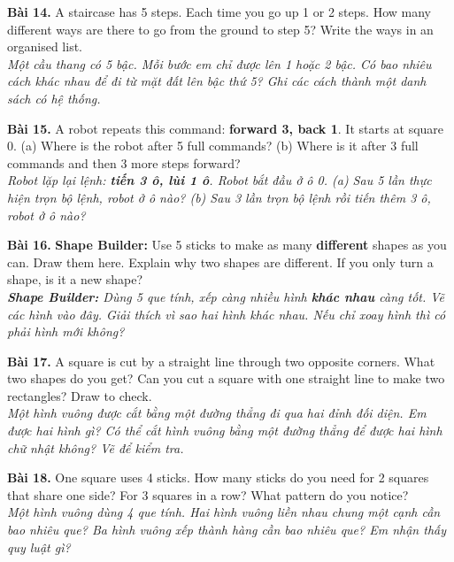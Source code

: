 \documentclass[11pt,a4paper]{article}
\newcommand{\answerline}{\noindent\dotfill\par\vspace{0.8mm}}
\begin{document}
\textbf{Bài 14.} A staircase has 5 steps. Each time you go up 1 or 2 steps. How many different ways are there to go from the ground to step 5? Write the ways in an organised list.\\
\textit{Một cầu thang có 5 bậc. Mỗi bước em chỉ được lên 1 hoặc 2 bậc. Có bao nhiêu cách khác nhau để đi từ mặt đất lên bậc thứ 5? Ghi các cách thành một danh sách có hệ thống.}\\
\answerline
\answerline
\answerline

\textbf{Bài 15.} A robot repeats this command: \textbf{forward 3, back 1}. It starts at square 0. (a) Where is the robot after 5 full commands? (b) Where is it after 3 full commands and then 3 more steps forward?\\
\textit{Robot lặp lại lệnh: \textbf{tiến 3 ô, lùi 1 ô}. Robot bắt đầu ở ô 0. (a) Sau 5 lần thực hiện trọn bộ lệnh, robot ở ô nào? (b) Sau 3 lần trọn bộ lệnh rồi tiến thêm 3 ô, robot ở ô nào?}\\
\answerline
\answerline

\textbf{Bài 16.} \textbf{Shape Builder:} Use 5 sticks to make as many \textbf{different} shapes as you can. Draw them here. Explain why two shapes are different. If you only turn a shape, is it a new shape?\\
\textit{\textbf{Shape Builder:} Dùng 5 que tính, xếp càng nhiều hình \textbf{khác nhau} càng tốt. Vẽ các hình vào đây. Giải thích vì sao hai hình khác nhau. Nếu chỉ xoay hình thì có phải hình mới không?}\\
\answerline
\answerline
\answerline
\answerline
\answerline

\textbf{Bài 17.} A square is cut by a straight line through two opposite corners. What two shapes do you get? Can you cut a square with one straight line to make two rectangles? Draw to check.\\
\textit{Một hình vuông được cắt bằng một đường thẳng đi qua hai đỉnh đối diện. Em được hai hình gì? Có thể cắt hình vuông bằng một đường thẳng để được hai hình chữ nhật không? Vẽ để kiểm tra.}\\
\answerline
\answerline
\answerline
\answerline

\textbf{Bài 18.} One square uses 4 sticks. How many sticks do you need for 2 squares that share one side? For 3 squares in a row? What pattern do you notice?\\
\textit{Một hình vuông dùng 4 que tính. Hai hình vuông liền nhau chung một cạnh cần bao nhiêu que? Ba hình vuông xếp thành hàng cần bao nhiêu que? Em nhận thấy quy luật gì?}\\
\answerline
\answerline
\answerline
\end{document}
